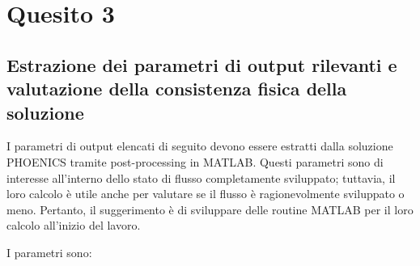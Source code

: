 
\section{Quesito 3}

\subsection*{Estrazione dei parametri di output rilevanti e valutazione della consistenza fisica della soluzione}

\vspace{0.5em}

I parametri di output elencati di seguito devono essere estratti dalla soluzione PHOENICS tramite post-processing in MATLAB. Questi parametri sono di interesse all'interno dello stato di flusso completamente sviluppato; tuttavia, il loro calcolo è utile anche per valutare se il flusso è ragionevolmente sviluppato o meno. Pertanto, il suggerimento è di sviluppare delle routine MATLAB per il loro calcolo all'inizio del lavoro.

I parametri sono:

